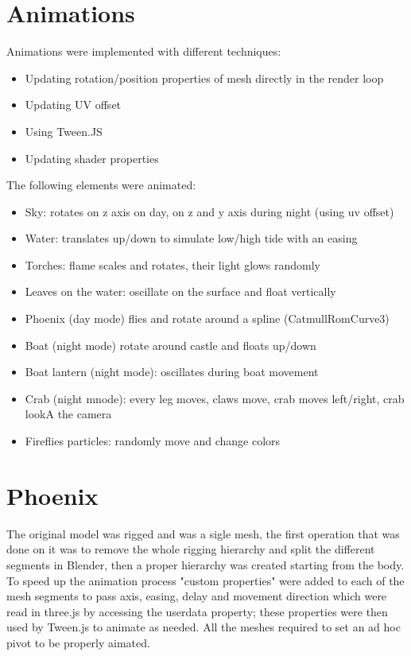 \documentclass[10pt,a4paper]{article}
\begin{document}
\section{Animations}

Animations were implemented with different techniques:

\begin{itemize}
 \item Updating rotation/position properties of mesh directly in the render loop
 \item Updating UV offset
 \item Using Tween.JS
 \item Updating shader properties
\end{itemize}

\bigbreak
\bigskip

The following elements were animated:
\begin{itemize}
 \item Sky: rotates on z axis on day, on z and y axis during night (using uv offset)
 \item Water: translates up/down to simulate low/high tide with an easing
 \item Torches: flame scales and rotates, their light glows randomly
 \item Leaves on the water: oscillate on the surface and float vertically
 \item Phoenix (day mode) flies and rotate around a spline (CatmullRomCurve3)
 \item Boat (night mode) rotate around castle and floats up/down
 \item Boat lantern (night mode): oscillates during boat movement
 \item Crab (night mnode): every leg moves, claws move, crab moves left/right, crab lookA the camera
 \item Fireflies particles: randomly move and change colors
 \end{itemize}

\section{Phoenix}

The original model was rigged and was a sigle mesh, the first operation that was done on it was to remove the whole rigging hierarchy and split the different segments in Blender, then a proper hierarchy was created starting  from the body. To speed up the animation process "custom properties" were  added to each of the mesh segments to pass axis, easing, delay and movement direction which were read in three.js by accessing the userdata property; these properties were then used by Tween.js to animate as needed. All the meshes required to set an ad hoc pivot to be properly aimated.
\end{document}
